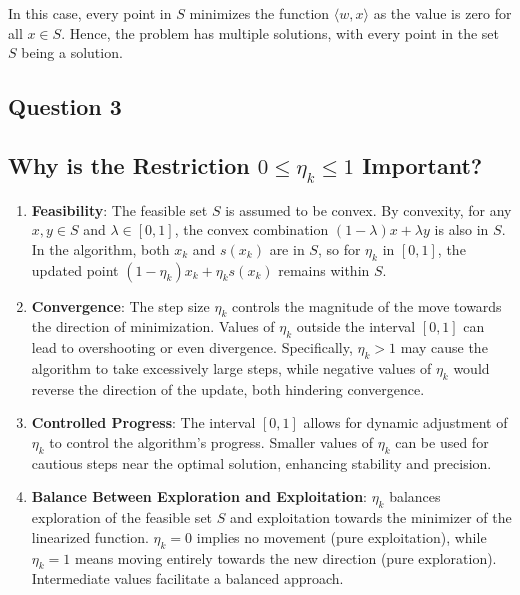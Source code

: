 \documentclass[12p]{article}
\begin{document}
In this case, every point in \( S \) minimizes the function \( \langle w, x \rangle \) as the value is zero for all \( x \in S \). Hence, the problem has multiple solutions, with every point in the set \( S \) being a solution.

\subsection*{Question 3} 

\subsection*{Why is the Restriction \( 0 \leq \eta_k \leq 1 \) Important?}

\begin{enumerate}
    \item \textbf{Feasibility}: The feasible set \( S \) is assumed to be convex. By convexity, for any \( x, y \in S \) and \( \lambda \in [0, 1] \), the convex combination \( (1-\lambda)x + \lambda y \) is also in \( S \). In the algorithm, both \( x_k \) and \( s(x_k) \) are in \( S \), so for \( \eta_k \) in \( [0, 1] \), the updated point \( (1-\eta_k)x_k + \eta_k s(x_k) \) remains within \( S \).

    \item \textbf{Convergence}: The step size \( \eta_k \) controls the magnitude of the move towards the direction of minimization. Values of \( \eta_k \) outside the interval \( [0, 1] \) can lead to overshooting or even divergence. Specifically, \( \eta_k > 1 \) may cause the algorithm to take excessively large steps, while negative values of \( \eta_k \) would reverse the direction of the update, both hindering convergence.

    \item \textbf{Controlled Progress}: The interval \( [0, 1] \) allows for dynamic adjustment of \( \eta_k \) to control the algorithm’s progress. Smaller values of \( \eta_k \) can be used for cautious steps near the optimal solution, enhancing stability and precision.

    \item \textbf{Balance Between Exploration and Exploitation}: \( \eta_k \) balances exploration of the feasible set \( S \) and exploitation towards the minimizer of the linearized function. \( \eta_k = 0 \) implies no movement (pure exploitation), while \( \eta_k = 1 \) means moving entirely towards the new direction (pure exploration). Intermediate values facilitate a balanced approach.
\end{enumerate}
\end{document}
